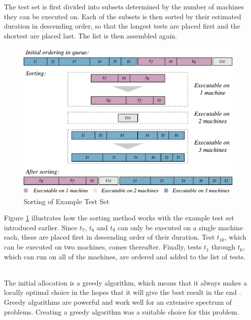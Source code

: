 The test set is first divided into subsets determined by the number of machines they can be executed on. Each of the subsets is then sorted by their estimated duration in descending order, so that the longest tests are placed first and the shortest are placed last. The list is then assembled again.

\begin{figure}[ptb]
    \centering
    \includegraphics[width=\textwidth]{figures/new/sorting.pdf}
    \caption{Sorting of Example Test Set}
    \label{fig.sorted_test_suite}
\end{figure}

Figure \ref{fig.sorted_test_suite} illustrates how the sorting method works with the example test set introduced earlier. Since $t_{7}$, $t_{8}$ and $t_{9}$ can only be executed on a single machine each, these are placed first in descending order of their duration. Test $t_{10}$, which can be executed on two machines, comes thereafter. Finally, tests $t_{1}$ through $t_{6}$, which can run on all of the machines, are ordered and added to the list of tests.






\vspace{7px}
\noindent \textbf{}\\
\noindent The initial allocation is a greedy algorithm, which means that it always makes a locally optimal choice in the hopes that it will give the best result in the end \cite{Algorithms}. Greedy algorithms are powerful and work well for an extensive spectrum of problems. Creating a greedy algorithm was a suitable choice for this problem.

